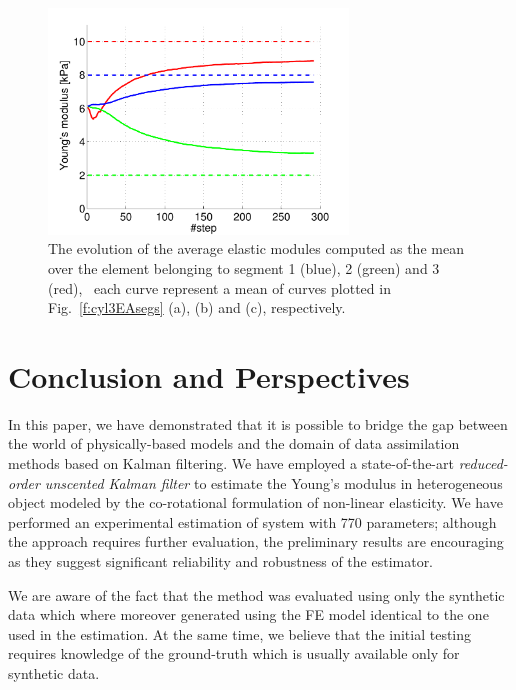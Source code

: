 \begin{figure}[t!]%
\includegraphics[height=6cm]{figs/cyl3EA_means.pdf}
\caption{The evolution of the average elastic modules computed as the mean over the element belonging to segment 1 (blue), 2 (green) and 3 (red), 
\ie\ each curve represent a mean of curves plotted in Fig.~\ref{f:cyl3EAsegs} (a), (b) and (c), respectively.}
\label{f:cyl3EAmeans}
\end{figure}

\section{Conclusion and Perspectives}
\label{s:conclusion}
In this paper, we have demonstrated that it is possible to bridge the gap between the world of physically-based models 
and the domain of data assimilation methods based on Kalman filtering. We have employed a state-of-the-art  
\emph{reduced-order unscented Kalman filter} to estimate the Young's modulus in heterogeneous object modeled by 
the co-rotational formulation of non-linear elasticity. 
We have performed an experimental estimation of system with 770 parameters; although the approach requires further 
evaluation, the preliminary results are encouraging as they suggest significant reliability and robustness of the estimator. 

We are aware of the fact that the method was evaluated using only the synthetic data which where moreover generated using 
the FE model identical to the one used in the estimation.
At the same time, we believe that the initial testing requires knowledge of the ground-truth which is
usually available only for synthetic data. 


